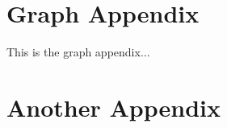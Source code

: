 \documentclass[12pt,a4paper,titlepage]{article}
\begin{document}
\newpage
\begin{appendices}

\section{Graph Appendix}
\label{appendix:graph}
This is the graph appendix...

\section{Another Appendix}

\end{appendices}
\end{document}
